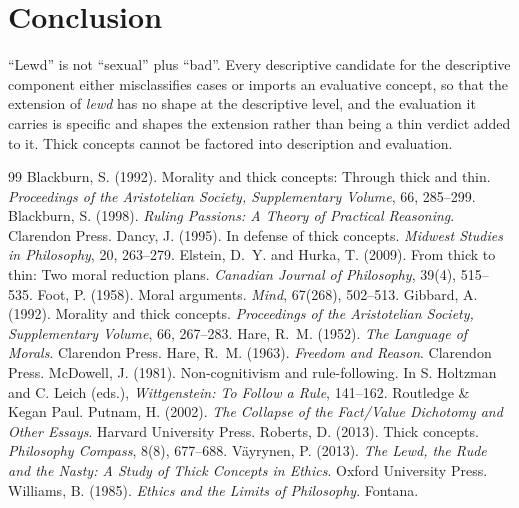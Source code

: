 \documentclass{situationist-preprint}
\begin{document}
\section{Conclusion}

\enquote{Lewd} is not \enquote{sexual} plus \enquote{bad}. Every descriptive candidate for the descriptive component either misclassifies cases or imports an evaluative concept, so that the extension of \emph{lewd} has no shape at the descriptive level, and the evaluation it carries is specific and shapes the extension rather than being a thin verdict added to it. Thick concepts cannot be factored into description and evaluation.

\begin{thebibliography}{99}\small
{} Blackburn, S. (1992). Morality and thick concepts: Through thick and thin. \emph{Proceedings of the Aristotelian Society, Supplementary Volume}, 66, 285--299.
 Blackburn, S. (1998). \emph{Ruling Passions: A Theory of Practical Reasoning}. Clarendon Press.
 Dancy, J. (1995). In defense of thick concepts. \emph{Midwest Studies in Philosophy}, 20, 263--279.
 Elstein, D.~Y. and Hurka, T. (2009). From thick to thin: Two moral reduction plans. \emph{Canadian Journal of Philosophy}, 39(4), 515--535.
 Foot, P. (1958). Moral arguments. \emph{Mind}, 67(268), 502--513.
 Gibbard, A. (1992). Morality and thick concepts. \emph{Proceedings of the Aristotelian Society, Supplementary Volume}, 66, 267--283.
 Hare, R.~M. (1952). \emph{The Language of Morals}. Clarendon Press.
 Hare, R.~M. (1963). \emph{Freedom and Reason}. Clarendon Press.
 McDowell, J. (1981). Non-cognitivism and rule-following. In S. Holtzman and C. Leich (eds.), \emph{Wittgenstein: To Follow a Rule}, 141--162. Routledge \& Kegan Paul.
 Putnam, H. (2002). \emph{The Collapse of the Fact/Value Dichotomy and Other Essays}. Harvard University Press.
 Roberts, D. (2013). Thick concepts. \emph{Philosophy Compass}, 8(8), 677--688.
 V\"ayrynen, P. (2013). \emph{The Lewd, the Rude and the Nasty: A Study of Thick Concepts in Ethics}. Oxford University Press.
 Williams, B. (1985). \emph{Ethics and the Limits of Philosophy}. Fontana.
\end{thebibliography}
\end{document}
